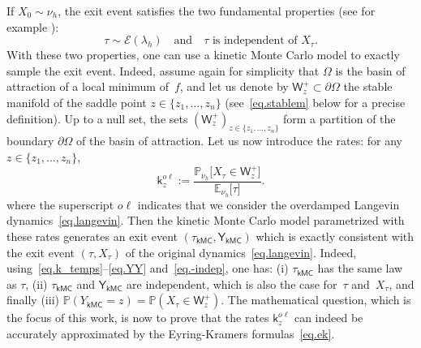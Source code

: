 \documentclass[10pt]{amsart}
\newcommand{\quand}{\quad\text{and}\quad}
\theoremstyle{plain}
\theoremstyle{definition}
\begin{document}
If $X_0\sim \nu_h$, the exit event satisfies the two fundamental properties (see
for example \cite[Prop.\,2.4]{le2012mathematical}):
\begin{equation}\label{eq.-indep}
\tau\sim\mathcal E(\lambda_h) \quand \tau \text{ is independent of } X_{\tau}.
\end{equation}
With these two properties, one can use a kinetic Monte Carlo model to
exactly sample the exit event. Indeed, assume again for simplicity that $\Omega$ is
the basin of attraction of a local minimum of~$f$, and let us denote
by $\mathsf W_z^+ \subset \partial \Omega$ the stable manifold of the
saddle point $z \in \{z_1, \dots, z_n\}$ (see~\eqref{eq.stablem} below
for a
precise definition). Up to a null set, the sets
$(\mathsf W_z^+)_{z \in \{z_1, \ldots, z_n\}}$ form a partition of the
boundary $\partial \Omega$ of the basin
of attraction. Let us now introduce the rates: for any $z \in
\{z_1, \ldots, z_n\}$,
\begin{equation}\label{eq:rates}
\mathsf k_{z}^{o\ell}:=\frac{\mathbb P_{\nu_{h}}\big [
X_{\tau} \in \mathsf W^+_{z} \big]}{\mathbb E_{\nu_{h}}\big [ \tau \big]}.
\end{equation}
where the superscript $o\ell$ indicates that we consider the
overdamped Langevin dynamics~\eqref{eq.langevin}. Then the kinetic
Monte Carlo model parametrized with these rates generates an exit event
$(\tau_{\mathsf {kMC}}, \mathsf Y_{\mathsf {kMC}})$ which is exactly
consistent with the exit event $(\tau,X_\tau)$ of the original
dynamics~\eqref{eq.langevin}. Indeed, using~\eqref{eq.k_temps}--\eqref{eq.YY}
and~\eqref{eq.-indep}, one has: (i) $\tau_{\mathsf {kMC}}$ has the same law as $\tau$,
(ii) $\tau_{\mathsf {kMC}}$ and $\mathsf Y_{\mathsf {kMC}}$ are
independent, which is also the case for~$\tau$ and~$X_\tau$, and finally (iii)
$\mathbb P(Y_{\mathsf {kMC}}=z)=\mathbb P(X_{\tau} \in \mathsf W^+_{z})$. The
mathematical question, which is the focus of this work, is now to
prove that the rates $\mathsf k_{z}^{o\ell}$ can indeed be accurately
approximated by the Eyring-Kramers formulas~\eqref{eq.ek}.
\end{document}
